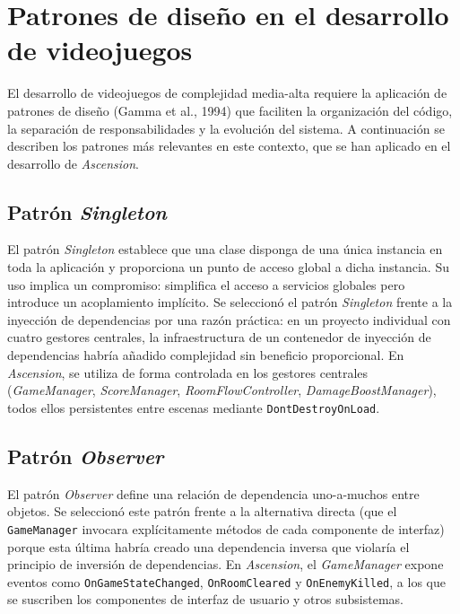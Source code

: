 \section{Patrones de diseño en el desarrollo de videojuegos}


El desarrollo de videojuegos de complejidad media-alta requiere la aplicación de patrones de diseño (Gamma et al., 1994) \cite{GAMMA_PATTERNS} que faciliten la organización del código, la separación de responsabilidades y la evolución del sistema. A continuación se describen los patrones más relevantes en este contexto, que se han aplicado en el desarrollo de \textit{Ascension}.

\subsection{Patrón \textit{Singleton}}


El patrón \textit{Singleton} establece que una clase disponga de una única instancia en toda la aplicación y proporciona un punto de acceso global a dicha instancia. Su uso implica un compromiso: simplifica el acceso a servicios globales pero introduce un acoplamiento implícito. Se seleccionó el patrón \textit{Singleton} frente a la inyección de dependencias por una razón práctica: en un proyecto individual con cuatro gestores centrales, la infraestructura de un contenedor de inyección de dependencias habría añadido complejidad sin beneficio proporcional. En \textit{Ascension}, se utiliza de forma controlada en los gestores centrales (\textit{GameManager}, \textit{ScoreManager}, \textit{RoomFlowController}, \textit{DamageBoostManager}), todos ellos persistentes entre escenas mediante \texttt{DontDestroyOnLoad}.

\subsection{Patrón \textit{Observer}}


El patrón \textit{Observer} define una relación de dependencia uno-a-muchos entre objetos. Se seleccionó este patrón frente a la alternativa directa (que el \texttt{GameManager} invocara explícitamente métodos de cada componente de interfaz) porque esta última habría creado una dependencia inversa que violaría el principio de inversión de dependencias. En \textit{Ascension}, el \textit{GameManager} expone eventos como \texttt{OnGameStateChanged}, \texttt{OnRoomCleared} y \texttt{OnEnemyKilled}, a los que se suscriben los componentes de interfaz de usuario y otros subsistemas.

